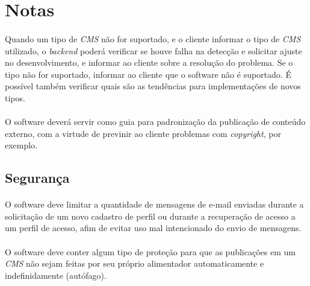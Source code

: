 \documentclass[a4paper,12pt]{article}
\def\cms{\emph{CMS}}
\begin{document}
\appendix

\section{Notas}

\paragraph{}
Quando um tipo de \cms{} não for suportado, e o cliente informar o tipo de
\cms{} utilizado, o \emph{backend} poderá verificar se houve falha na detecção
e solicitar ajuste no desenvolvimento, e informar ao cliente sobre a resolução
do problema. Se o tipo não for suportado, informar ao cliente que o software
não é suportado. É possível também verificar quais são as tendências para
implementações de novos tipos.

\paragraph{}
O software deverá servir como guia para padronização da publicação de conteúdo
externo, com a virtude de previnir ao cliente problemas com \emph{copyright},
por exemplo.

\subsection{Segurança}

\paragraph{}
O software deve limitar a quantidade de mensagens de e-mail enviadas durante a
solicitação de um novo cadastro de perfil ou durante a recuperação de acesso a
um perfil de acesso, afim de evitar uso mal intencionado do envio de mensagens.

\paragraph{}
O software deve conter algum tipo de proteção para que as publicações em um
\cms{} não sejam feitas por seu próprio alimentador automaticamente e
indefinidamente (autófago).
\end{document}
